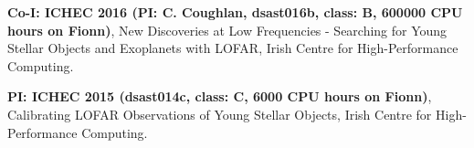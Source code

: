 \begin{cvpubs}
  \cvpub
    {
      \begin{cvlist}
        \item {\textbf{Co-I: ICHEC 2016 (PI: C. Coughlan, dsast016b, class: B, 600000 CPU hours on Fionn)}, New Discoveries at Low Frequencies - Searching for Young Stellar Objects and Exoplanets with LOFAR, Irish Centre for High-Performance Computing.}
  \item {\textbf{PI: ICHEC 2015 (dsast014c, class: C, 6000 CPU hours on Fionn)}, Calibrating LOFAR Observations of Young Stellar Objects, Irish Centre for High-Performance Computing.}
      \end{cvlist}
    }
\end{cvpubs}